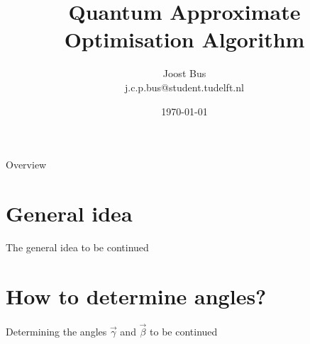 \documentclass{beamer}
\title[]{Quantum Approximate Optimisation Algorithm}
\institute[]{Technische Universiteit Delft, Nederland}
\author{Joost Bus \\ \tiny{j.c.p.bus@student.tudelft.nl}}
\date{\today}
\begin{document}
{
\frame{\titlepage}
}
{}

\begin{frame}{Overview}
\tableofcontents
\end{frame}

\section{General idea}
\begin{frame}{The general idea}
to be continued
\end{frame}

\section{How to determine angles?}
\begin{frame}{Determining the angles $\vec{\gamma}$ and $\vec{\beta}$}
to be continued
\end{frame}
\end{document}

